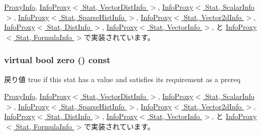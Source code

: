 \hyperlink{classStats_1_1ProxyInfo_adb3e1761782ea843b4400aeeaa6c4887}{ProxyInfo}, \hyperlink{classStats_1_1InfoProxy_adb3e1761782ea843b4400aeeaa6c4887}{InfoProxy$<$ Stat, VectorDistInfo $>$}, \hyperlink{classStats_1_1InfoProxy_adb3e1761782ea843b4400aeeaa6c4887}{InfoProxy$<$ Stat, ScalarInfo $>$}, \hyperlink{classStats_1_1InfoProxy_adb3e1761782ea843b4400aeeaa6c4887}{InfoProxy$<$ Stat, SparseHistInfo $>$}, \hyperlink{classStats_1_1InfoProxy_adb3e1761782ea843b4400aeeaa6c4887}{InfoProxy$<$ Stat, Vector2dInfo $>$}, \hyperlink{classStats_1_1InfoProxy_adb3e1761782ea843b4400aeeaa6c4887}{InfoProxy$<$ Stat, DistInfo $>$}, \hyperlink{classStats_1_1InfoProxy_adb3e1761782ea843b4400aeeaa6c4887}{InfoProxy$<$ Stat, VectorInfo $>$}, と \hyperlink{classStats_1_1InfoProxy_adb3e1761782ea843b4400aeeaa6c4887}{InfoProxy$<$ Stat, FormulaInfo $>$}で実装されています。\hypertarget{classStats_1_1Info_a3dfb6e014cb026189ed2317aba5700b2}{
\subsubsection[{zero}]{\setlength{\rightskip}{0pt plus 5cm}virtual bool zero () const}}
\label{classStats_1_1Info_a3dfb6e014cb026189ed2317aba5700b2}
\begin{DoxyReturn}{戻り値}
true if this stat has a value and satisfies its requirement as a prereq 
\end{DoxyReturn}


\hyperlink{classStats_1_1ProxyInfo_a4e72b01b727d3165e75cba84eb507491}{ProxyInfo}, \hyperlink{classStats_1_1InfoProxy_a4e72b01b727d3165e75cba84eb507491}{InfoProxy$<$ Stat, VectorDistInfo $>$}, \hyperlink{classStats_1_1InfoProxy_a4e72b01b727d3165e75cba84eb507491}{InfoProxy$<$ Stat, ScalarInfo $>$}, \hyperlink{classStats_1_1InfoProxy_a4e72b01b727d3165e75cba84eb507491}{InfoProxy$<$ Stat, SparseHistInfo $>$}, \hyperlink{classStats_1_1InfoProxy_a4e72b01b727d3165e75cba84eb507491}{InfoProxy$<$ Stat, Vector2dInfo $>$}, \hyperlink{classStats_1_1InfoProxy_a4e72b01b727d3165e75cba84eb507491}{InfoProxy$<$ Stat, DistInfo $>$}, \hyperlink{classStats_1_1InfoProxy_a4e72b01b727d3165e75cba84eb507491}{InfoProxy$<$ Stat, VectorInfo $>$}, と \hyperlink{classStats_1_1InfoProxy_a4e72b01b727d3165e75cba84eb507491}{InfoProxy$<$ Stat, FormulaInfo $>$}で実装されています。

